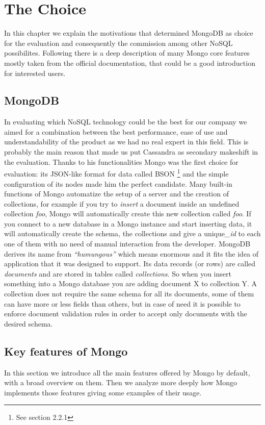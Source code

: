 \chapter{The Choice}
\label{cha:2}
In this chapter we explain the motivations that determined  MongoDB as choice for the evaluation and consequently the commission among other NoSQL possibilites.
Following there is a deep description of many Mongo core features mostly taken from the official documentation, that could be a good introduction for interested users.

\section{MongoDB}
\label{sec:1}
In evaluating which NoSQL technology could be the best for our company we aimed for a combination between the best performance,  ease of use and understandability of the product as we had no real expert in this field.
This is probably the main reason that made us put Cassandra as secondary makeshift in the evaluation.
Thanks to his functionalities Mongo was the first choice for evaluation: its JSON-like format for data called BSON \footnote{See section 2.2.1} and the simple configuration of its nodes made him the perfect candidate.
Many built-in functions of Mongo automatize the setup of a server and the creation of collections, for example if you try to \textit{insert} a document inside an undefined collection \textit{foo}, Mongo will automatically create this new collection called \textit{foo}.
If you connect to a new database in a Mongo instance and start inserting data, it will automatically create the schema, the collections and give a unique\textit{\_id} to each one of them  with no need of manual interaction from the developer.
MongoDB derives its name from \textit{“humungous”} which means enormous and it fits the idea of application that it was designed to support.
Its data records (or rows) are called \textit{documents} and are stored in tables called \textit{collections}. So when you insert something into a Mongo database you are adding document X to collection Y.
A collection does not require the same schema for all its documents, some of them can have more or less fields than others, but in case of need it is possible to enforce document validation rules in order to accept only documents with the desired schema.

\section{Key features of Mongo}
\label{sec:2}
In this section we introduce all the main features offered by Mongo by default, with a broad overview on them. 
Then we analyze more deeply how Mongo implements those features giving some examples of their usage.

